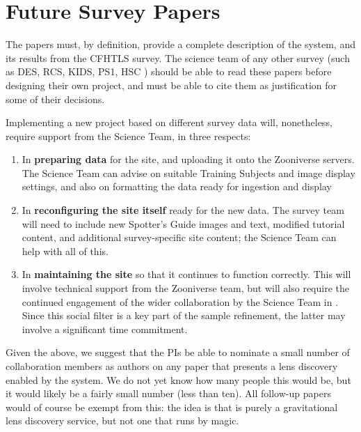 \documentclass[a4paper]{article}
\begin{document}
\section{Future Survey Papers}
\label{sec:series}

The \sw papers must, by definition, provide a complete description of
the system, and its results from the CFHTLS survey. The science team of
any other survey (such as DES, RCS, KIDS, PS1, HSC \etc) should be able
to read these papers before designing their own \sw project, and must be
able to cite them as justification for some of their decisions.

Implementing a new project based on different survey data will,
nonetheless, require support from the \sw Science Team, in three
respects: 
\begin{enumerate}

\item In {\bf preparing data} for the site, and uploading it onto the
Zooniverse servers. The \sw Science Team can advise on suitable Training
Subjects and image display settings, and also on formatting the data
ready for ingestion and display 

\item In {\bf reconfiguring the site itself} ready for the new data. The
survey team will need to include new Spotter's Guide images and text,
modified tutorial content, and additional survey-specific site content;
the \sw Science Team can help with all of this.

\item In {\bf maintaining the site} so that it continues to function
correctly. This will involve technical support from the Zooniverse team,
but will also require the continued engagement of the wider
collaboration by the Science Team in \Talk. Since this social filter is
a key part of the sample refinement, the latter may involve a
significant time commitment.

\end{enumerate}

\noindent Given the above, we suggest that the PIs be able to nominate a
small number of \sw collaboration members as authors on any paper that
presents a lens discovery enabled by the \sw system. We do not yet know
how many people this would be, but it would likely be a fairly small
number (less than ten). All follow-up papers would of course be exempt
from this: the idea is that \sw is purely a gravitational lens discovery
service, but not one that runs by magic.


\end{document}
